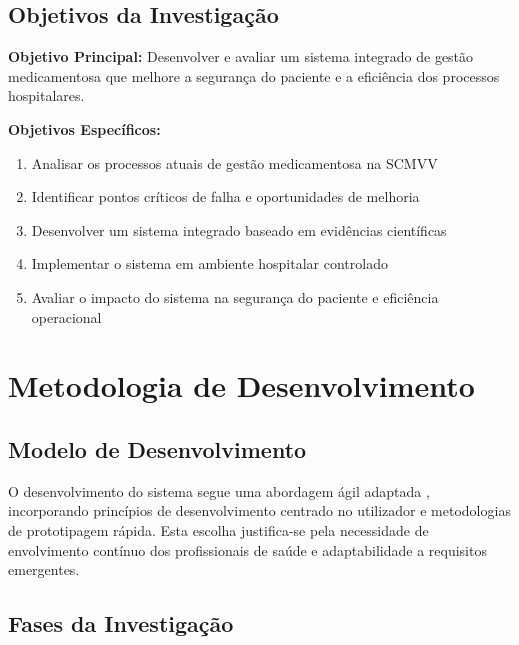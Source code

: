 \subsection{Objetivos da Investigação}

\textbf{Objetivo Principal:} Desenvolver e avaliar um sistema integrado de gestão medicamentosa que melhore a segurança do paciente e a eficiência dos processos hospitalares.

\textbf{Objetivos Específicos:}
\begin{enumerate}
    \item Analisar os processos atuais de gestão medicamentosa na SCMVV
    \item Identificar pontos críticos de falha e oportunidades de melhoria
    \item Desenvolver um sistema integrado baseado em evidências científicas
    \item Implementar o sistema em ambiente hospitalar controlado
    \item Avaliar o impacto do sistema na segurança do paciente e eficiência operacional
\end{enumerate}

\section{Metodologia de Desenvolvimento}

\subsection{Modelo de Desenvolvimento}

O desenvolvimento do sistema segue uma abordagem ágil adaptada \cite{fowler2018}, incorporando princípios de desenvolvimento centrado no utilizador e metodologias de prototipagem rápida. Esta escolha justifica-se pela necessidade de envolvimento contínuo dos profissionais de saúde e adaptabilidade a requisitos emergentes.

\subsection{Fases da Investigação}

